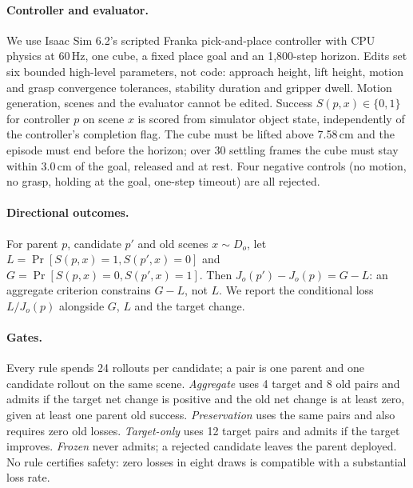 \documentclass[letterpaper]{article} %
\begin{document}
\paragraph{Controller and evaluator.} We use Isaac Sim 6.2's scripted Franka pick-and-place controller \citep{nvidia2026franka} with CPU physics at 60\,Hz, one cube, a fixed place goal and an 1{,}800-step horizon. Edits set six bounded high-level parameters, not code: approach height, lift height, motion and grasp convergence tolerances, stability duration and gripper dwell. Motion generation, scenes and the evaluator cannot be edited. Success $S(p,x)\in\{0,1\}$ for controller $p$ on scene $x$ is scored from simulator object state, independently of the controller's completion flag. The cube must be lifted above 7.58\,cm and the episode must end before the horizon; over 30 settling frames the cube must stay within 3.0\,cm of the goal, released and at rest. Four negative controls (no motion, no grasp, holding at the goal, one-step timeout) are all rejected.

\paragraph{Directional outcomes.} For parent $p$, candidate $p'$ and old scenes $x\sim D_o$, let $L=\Pr[S(p,x)=1, S(p',x)=0]$ and $G=\Pr[S(p,x)=0, S(p',x)=1]$. Then $J_o(p')-J_o(p)=G-L$: an aggregate criterion constrains $G-L$, not $L$. We report the conditional loss $L/J_o(p)$ alongside $G$, $L$ and the target change.

\paragraph{Gates.} Every rule spends 24 rollouts per candidate; a pair is one parent and one candidate rollout on the same scene. \emph{Aggregate} uses 4 target and 8 old pairs and admits if the target net change is positive and the old net change is at least zero, given at least one parent old success. \emph{Preservation} uses the same pairs and also requires zero old losses. \emph{Target-only} uses 12 target pairs and admits if the target improves. \emph{Frozen} never admits; a rejected candidate leaves the parent deployed. No rule certifies safety: zero losses in eight draws is compatible with a substantial loss rate.
\end{document}
